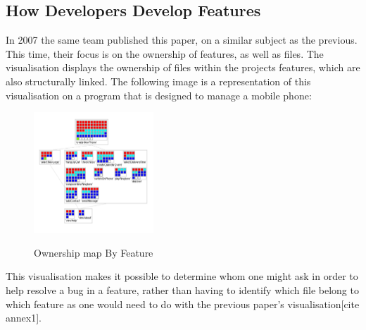 \subsection{How Developers Develop Features }

In 2007 the same team published this paper, on a similar subject as the previous. This time, their focus is on the ownership of features, as well as files. The visualisation displays the ownership of files within the projects features, which are also structurally linked. The following image is a representation of this visualisation on a program that is designed to manage a mobile phone:

\begin{figure}[H]
\centering
\includegraphics[width=0.4\textwidth]{./resources/girba2007.png}~
\caption{Ownership map By Feature}
\label{fig:ownership_map_by_feature}
\end{figure}

This visualisation makes it possible to determine whom one might ask in order to help resolve a bug in a feature, rather than having to identify which file belong to which feature as one would need to do with the previous paper's visualisation[cite annex1].